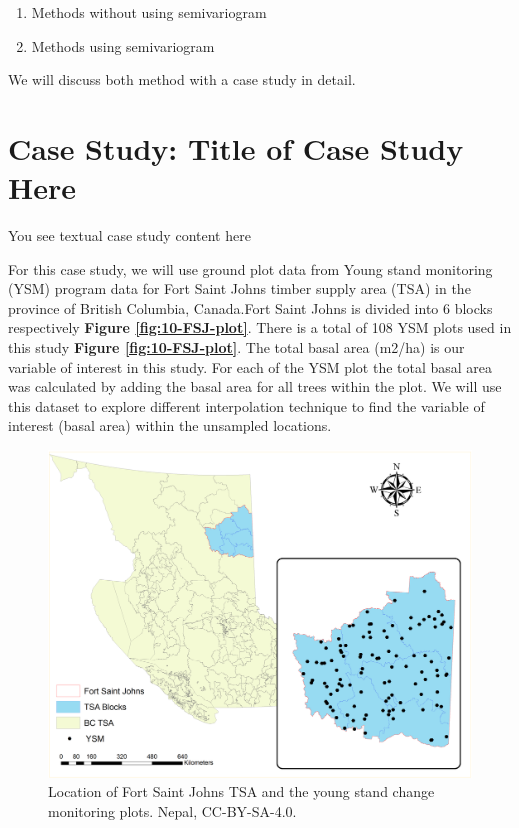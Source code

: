 \documentclass[
]{book}
\providecommand{\tightlist}{%
  \setlength{\itemsep}{0pt}\setlength{\parskip}{0pt}}
\begin{document}
\begin{enumerate}
\def\labelenumi{\arabic{enumi}.}
\tightlist
\item
  Methods without using semivariogram
\item
  Methods using semivariogram
\end{enumerate}

We will discuss both method with a case study in detail.

\hypertarget{case-study-title-of-case-study-here-2}{%
\section{Case Study: Title of Case Study Here}\label{case-study-title-of-case-study-here-2}}

You see textual case study content here

For this case study, we will use ground plot data from Young stand monitoring (YSM) program data \citep{province_of_bc_provincial_2018} for Fort Saint Johns timber supply area (TSA) in the province of British Columbia, Canada.Fort Saint Johns is divided into 6 blocks respectively \textbf{Figure \ref{fig:10-FSJ-plot}}. There is a total of 108 YSM plots used in this study \textbf{Figure \ref{fig:10-FSJ-plot}}. The total basal area (m2/ha) is our variable of interest in this study. For each of the YSM plot the total basal area was calculated by adding the basal area for all trees within the plot. We will use this dataset to explore different interpolation technique to find the variable of interest (basal area) within the unsampled locations.

\begin{figure}
\includegraphics[width=45.83in]{images/10-FSJ-plot} \caption{ Location of Fort Saint Johns TSA and the young stand change monitoring plots. Nepal, CC-BY-SA-4.0.}\label{fig:10-FSJ-plot1}
\end{figure}
\end{document}
